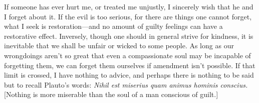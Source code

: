 \documentclass[a4paper, 12pt]{article}
\begin{document}
If someone has ever hurt me, or treated me unjustly, I sincerely wish that he
and I forget about it. If the evil is too serious, for there are things one
cannot forget, what I seek is restoration—and no amount of guilty feelings can
have a restorative effect. Inversely, though one should in general strive for
kindness, it is inevitable that we shall be unfair or wicked to some people. As
long as our wrongdoings aren't so great that even a compassionate soul may be
incapable of forgetting them, we can forget them ourselves if amendment isn't
possible. If that limit is crossed, I have nothing to advice, and perhaps there
is nothing to be said but to recall Plauto's words: \textit{Nihil est miserius
quam animus hominis conscius.} [Nothing is more miserable than the soul of a
man conscious of guilt.]
\end{document}
